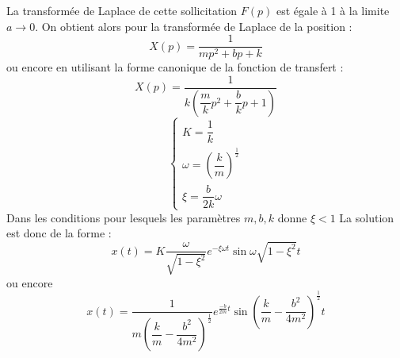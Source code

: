 La transformée de Laplace de cette sollicitation $F(p)$ est égale à 1 à 
la limite $a\to0$. On obtient alors pour la transformée de Laplace de la 
position :
\[
    X(p)=\dfrac{1}{mp^2+bp+k}
\]
ou encore en utilisant la forme canonique de la fonction de transfert :
\[
    X(p)=\dfrac{1}{k\left(\dfrac{m}{k}p^2+\dfrac{b}{k}p+1\right)}
\]
\[
    \begin{cases}
        K=\dfrac{1}{k}\\[1.5em]
        \omega=\left(\dfrac{k}{m}\right)^{\frac{1}{2}}\\[1.5em]
        \xi=\dfrac{b}{2k}\omega
    \end{cases}
\]
Dans les conditions pour lesquels les paramètres $m, b ,k$ donne $\xi<1$ 
La solution est donc de la forme :
\[
    x(t)=K\dfrac{\omega}{\sqrt{1-\xi^2}}
         e^{-\xi\omega t}\sin{\omega\sqrt{1-\xi^2} t} 
\]
ou encore 
\[
    x(t)=\dfrac{1}{m\left(\dfrac{k}{m}-\dfrac{b^2}{4m^2}\right)^{\frac{1}{2}}}
         e^{\frac{-b}{2m}t}\sin{\left(\dfrac{k}{m}-\dfrac{b^2}{4m^2}\right)^
         {\frac{1}{2}}t}
\]

